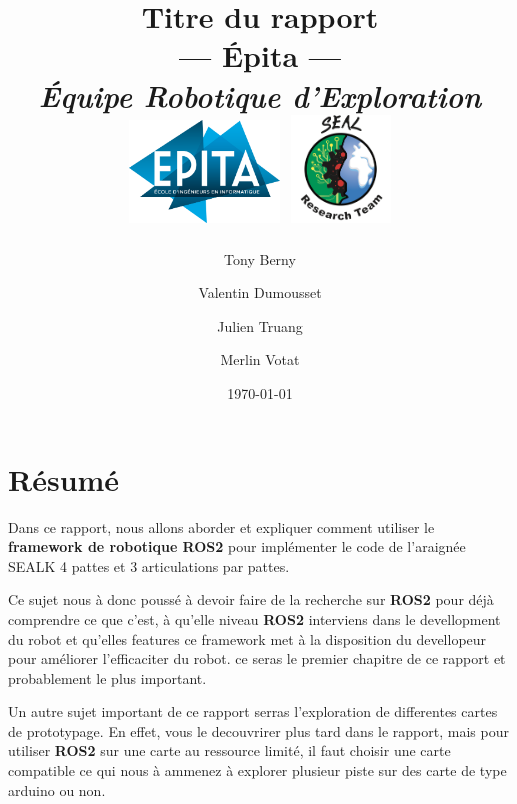 \documentclass[12pt, a4paper]{report}
\title{\textbf{Titre du rapport} \\ \Large{--- Épita --- \\ \textit{Équipe Robotique d'Exploration}} \\ \vspace{1,5cm} \includegraphics[width=0.3\textwidth]{./img/logo_epita} \includegraphics[width=0.2\textwidth]{./img/logo_equipe_robotique_exploration} \vspace{1,5cm}}
\date{\today}
\author{Tony Berny \and Valentin Dumousset \and Julien Truang \and Merlin Votat}
\begin{document}
	\maketitle
	
	

	\chapter*{Résumé}

Dans ce rapport, nous allons aborder et expliquer comment utiliser le \textbf{framework de robotique ROS2} pour implémenter le code de l'araignée SEALK 4 pattes et 3 articulations par pattes.

Ce sujet nous à donc poussé à devoir faire de la recherche sur \textbf{ROS2} pour déjà comprendre ce que c'est, à qu'elle niveau \textbf{ROS2} interviens dans le devellopment du robot et qu'elles features ce framework met à la disposition du devellopeur pour améliorer l'efficaciter du robot. ce seras le premier chapitre de ce rapport et probablement le plus important.

Un autre sujet important de ce rapport serras l'exploration de differentes cartes de prototypage. En effet, vous le decouvrirer plus tard dans le rapport, mais pour utiliser \textbf{ROS2} sur une carte au ressource limité, il faut choisir une carte compatible ce qui nous à ammenez à explorer plusieur piste sur des carte de type arduino ou non.
	\tableofcontents

	




			



	

	


\printglossaries
	




	
\end{document}
